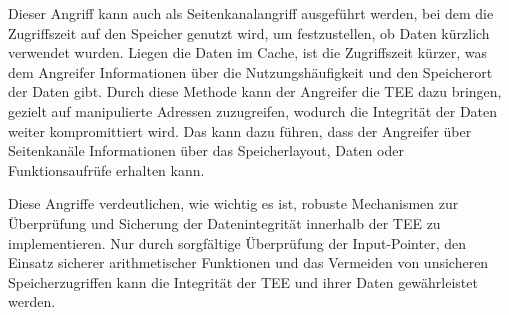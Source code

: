 Dieser Angriff kann auch als Seitenkanalangriff ausgeführt werden, bei dem die Zugriffszeit auf den Speicher genutzt wird, um festzustellen, ob Daten kürzlich verwendet wurden. Liegen die Daten im Cache, ist die Zugriffszeit kürzer, was dem Angreifer Informationen über die Nutzungshäufigkeit und den Speicherort der Daten gibt. Durch diese Methode kann der Angreifer die TEE dazu bringen, gezielt auf manipulierte Adressen zuzugreifen, wodurch die Integrität der Daten weiter kompromittiert wird. Das kann dazu führen, dass der Angreifer über Seitenkanäle Informationen über das Speicherlayout, Daten oder Funktionsaufrüfe erhalten kann.


Diese Angriffe verdeutlichen, wie wichtig es ist, robuste Mechanismen zur Überprüfung und Sicherung der Datenintegrität innerhalb der TEE zu implementieren. Nur durch sorgfältige Überprüfung der Input-Pointer, den Einsatz sicherer arithmetischer Funktionen und das Vermeiden von unsicheren Speicherzugriffen kann die Integrität der TEE und ihrer Daten gewährleistet werden.
